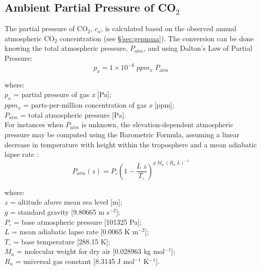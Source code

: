 \subsection{Ambient Partial Pressure of CO$_2$}
\label{sec:ca}
The partial pressure of CO$_2$, $c_a$, is calculated based on the observed annual atmospheric CO$_2$ concentration (see \S \ref{sec:gepnoaa}). 
The conversion can be done knowing the total atmospheric pressure, $P_{atm}$, and using Dalton's Law of Partial Pressure:
\begin{equation}
\label{eq:pp}
    p_x = 1\times 10^{-6}\; ppm_x\; P_{atm}
\end{equation}

\noindent where:\\
\indent $p_x$ = partial pressure of gas \textit{x} [Pa];\\
\indent $ppm_x$ = parts-per-million concentration of gas \textit{x} [ppm];\\
\indent $P_{atm}$ = total atmospheric pressure [Pa].\\

\noindent For instances when $P_{atm}$ is unknown, the elevation-dependent atmospheric pressure may be computed using the Barometric Formula, assuming a linear decrease in temperature with height within the troposphere and a mean adiabatic lapse rate \parencite{berberan97}:
%
\begin{equation}
\label{eq:pz}
    P_{atm}\left( z \right) = P_{\circ} \left( 
    	1 - \frac{L\; z}{T_{\circ}} 
    \right)^{g\; M_a\; \left(R_u\; L\right)^{-1}}
\end{equation}

\noindent where:\\
\indent $z$ = altitude above mean sea level [m];\\
\indent $g$ = standard gravity [9.80665 m s$^{-2}$];\\
\indent $P_{\circ}$ = base atmospheric pressure [101325 Pa];\\
\indent $L$ = mean adiabatic lapse rate [0.0065 K m$^{-2}$];\\
\indent $T_{\circ}$ = base temperature [288.15 K];\\
\indent $M_a$ = molecular weight for dry air [0.028963 kg mol$^{-1}$];\\
\indent $R_u$ = universal gas constant [8.3145 J mol$^{-1}$ K$^{-1}$].\\

